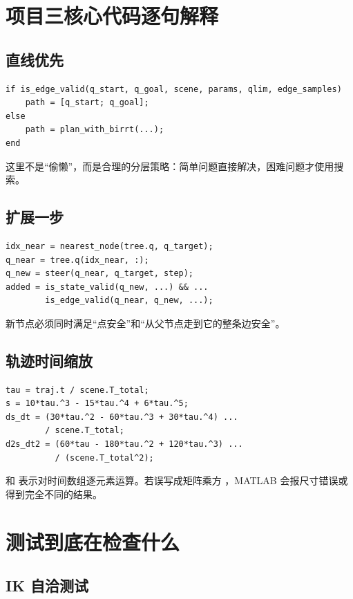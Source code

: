 \section{项目三核心代码逐句解释}

\subsection{直线优先}

\begin{lstlisting}
if is_edge_valid(q_start, q_goal, scene, params, qlim, edge_samples)
    path = [q_start; q_goal];
else
    path = plan_with_birrt(...);
end
\end{lstlisting}

这里不是“偷懒”，而是合理的分层策略：简单问题直接解决，困难问题才使用搜索。

\subsection{扩展一步}

\begin{lstlisting}
idx_near = nearest_node(tree.q, q_target);
q_near = tree.q(idx_near, :);
q_new = steer(q_near, q_target, step);
added = is_state_valid(q_new, ...) && ...
        is_edge_valid(q_near, q_new, ...);
\end{lstlisting}

新节点必须同时满足“点安全”和“从父节点走到它的整条边安全”。

\subsection{轨迹时间缩放}

\begin{lstlisting}
tau = traj.t / scene.T_total;
s = 10*tau.^3 - 15*tau.^4 + 6*tau.^5;
ds_dt = (30*tau.^2 - 60*tau.^3 + 30*tau.^4) ...
        / scene.T_total;
d2s_dt2 = (60*tau - 180*tau.^2 + 120*tau.^3) ...
          / (scene.T_total^2);
\end{lstlisting}

 和  表示对时间数组逐元素运算。若误写成矩阵乘方
\code{\^}，MATLAB 会报尺寸错误或得到完全不同的结果。

\section{测试到底在检查什么}

\subsection{IK 自洽测试}

